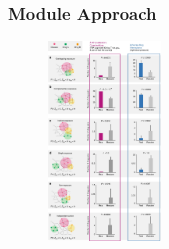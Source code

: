 \documentclass{beamer}
\begin{document}
\begin{frame}
  \frametitle{Module Approach}
  \begin{figure}[!htb]
      \includegraphics[width=\linewidth, height=200]{figs/barabasi-hypertension}
    \endminipage

\end{figure}
\end{frame}
\end{document}
